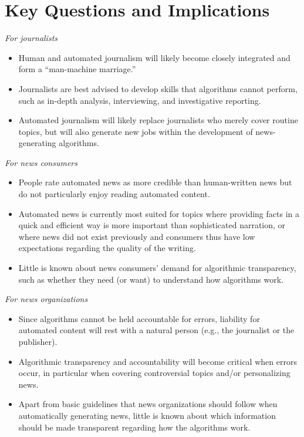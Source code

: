 \documentclass[notoc, symmetric, nobib, nols]{towcenter-guideto-book}
\begin{document}
\section{Key Questions and Implications}

\textit{For journalists}
\begin{itemize}
\item Human and automated journalism will likely become closely integrated and form a “man-machine marriage.” 
\item Journalists are best advised to develop skills that algorithms cannot perform, such as in-depth analysis, interviewing, and investigative reporting. 
\item Automated journalism will likely replace journalists who merely cover routine topics, but will also generate new jobs within the development of news-generating algorithms. 
\end{itemize}

\textit{For news consumers}
\begin{itemize}
\item People rate automated news as more credible than human-written news but do not particularly enjoy reading automated content.
\item Automated news is currently most suited for topics where providing facts in a quick and efficient way is more important than sophisticated narration, or where news did not exist previously and consumers thus have low expectations regarding the quality of the writing. 
\item Little is known about news consumers' demand for algorithmic transparency, such as whether they need (or want) to understand how algorithms work. 
\end{itemize}

\textit{For news organizations}
\begin{itemize}
\item Since algorithms cannot be held accountable for errors, liability for automated content will rest with a natural person (e.g., the journalist or the publisher).
\item Algorithmic transparency and accountability will become critical when errors occur, in particular when covering controversial topics and/or personalizing news.
\item Apart from basic guidelines that news organizations should follow when automatically generating news, little is known about which information should be made transparent regarding how the algorithms work. 
\end{itemize}
\end{document}
